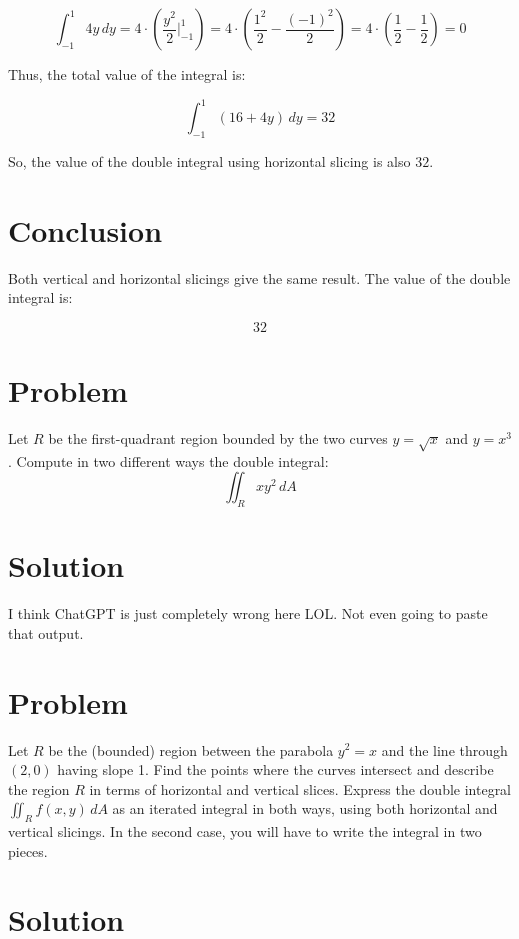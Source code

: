 \documentclass[11pt]{article}
\begin{document}
\[
\int_{-1}^1 4y \, dy = 4 \cdot \left( \frac{y^2}{2} \bigg|_{-1}^1 \right) = 4 \cdot ( \frac{1^2}{2} - \frac{(-1)^2}{2} ) = 4 \cdot ( \frac{1}{2} - \frac{1}{2} ) = 0
\]

Thus, the total value of the integral is:

\[
\int_{-1}^1 (16 + 4y) \, dy = 32
\]

So, the value of the double integral using horizontal slicing is also \( 32 \).

\newpage

\section{Conclusion}

Both vertical and horizontal slicings give the same result. The value of the double integral is:

\[
\boxed{32}
\]



\newpage

\section{Problem}
Let \( R \) be the first-quadrant region bounded by the two curves \( y = \sqrt{x} \) and \( y = x^3 \). Compute in two different ways the double integral:
\[
\iint_R x y^2 \, dA
\]

\newpage

\section{Solution}
I think ChatGPT is just completely wrong here LOL.
Not even going to paste that output.

\newpage

\section{Problem}
Let \( R \) be the (bounded) region between the parabola \( y^2 = x \) and the line through \( (2, 0) \) having slope 1. Find the points where the curves intersect and describe the region \( R \) in terms of horizontal and vertical slices. Express the double integral \( \iint_R f(x, y) \, dA \) as an iterated integral in both ways, using both horizontal and vertical slicings. In the second case, you will have to write the integral in two pieces.

\newpage

\section{Solution}
\end{document}
